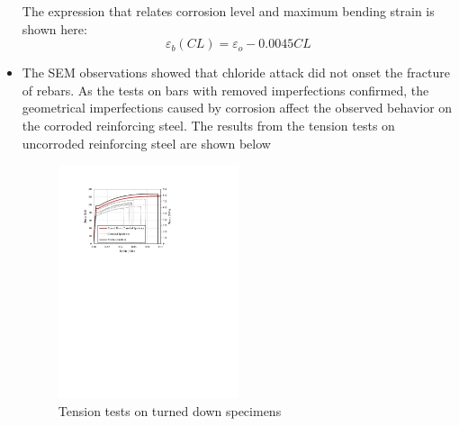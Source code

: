 \begin{itemize}
    The expression that relates corrosion level and maximum bending strain is shown here:
    \begin{equation}
        \varepsilon_{b}(CL) = \varepsilon_{o}-0.0045CL
        \label{eq.Calderon_eb_vs_CL_ch7}
    \end{equation}
    
    \item The SEM observations showed that chloride attack did not onset the fracture of rebars. As the tests on bars with removed imperfections confirmed, the geometrical imperfections caused by corrosion affect the observed behavior on the corroded reinforcing steel. The results from the tension tests on uncorroded reinforcing steel are shown below
    
    \begin{figure}[htbp]
	\centering
	\includegraphics[width=0.5\textwidth]{VAC Thesis 2.0/Chapter-4/figs/TensionTest_TurnedDown.pdf}
	\caption{Tension tests on turned down specimens}
	\label{fig:TurnedDown_tension_tests_ch7}
\end{figure}


\end{itemize}

